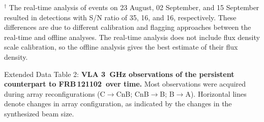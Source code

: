 \documentclass{nature_frb}
\newcommand{\frb}{FRB\,121102}
\begin{document}
$^\dag$
The real-time analysis of events on 23 August, 02 September, and 15 September resulted in detections with S/N ratio of 35, 16, and 16, respectively.
These differences are due to different calibration and flagging approaches between the real-time and offline analyses.  The real-time analysis does not include flux density scale calibration, so the offline analysis gives the best estimate of their flux density.



\clearpage
\bigskip\noindent
Extended Data Table 2: {\bf VLA 3~GHz observations of the persistent counterpart to \frb\ over time.}
Most observations were acquired during array reconfigurations (C$\rightarrow$CnB; CnB$\rightarrow$B; B$\rightarrow$A).
Horizontal lines denote changes in array configuration, as indicated by the changes in the synthesized beam size.
\end{document}
